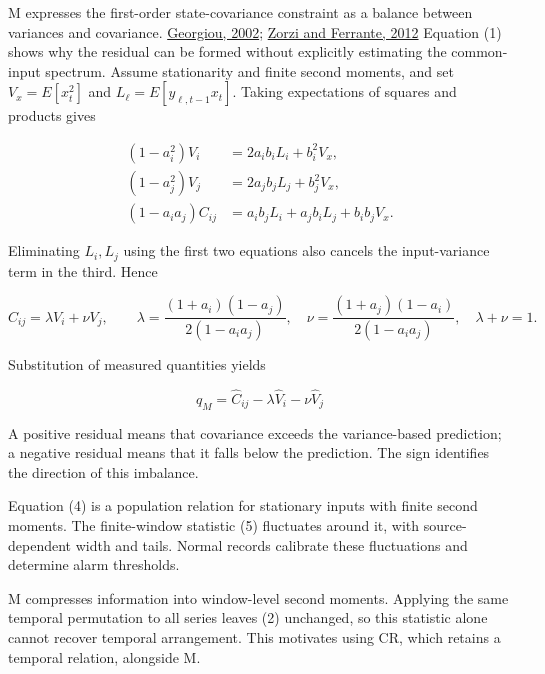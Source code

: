 \documentclass[10pt,a4paper]{article}
\begin{document}
M expresses the first-order state-covariance constraint as a balance between variances and covariance. \href{https://doi.org/10.1109/TAC.2002.800643}{Georgiou, 2002}; \href{https://doi.org/10.1016/j.automatica.2012.05.057}{Zorzi and Ferrante, 2012} Equation (1) shows why the residual can be formed without explicitly estimating the common-input spectrum. Assume stationarity and finite second moments, and set \(V_x=E[x_t^2]\) and \(L_\ell=E[y_{\ell,t-1}x_t]\). Taking expectations of squares and products gives

\begin{equation}
\begin{aligned}
(1-a_i^2)V_i&=2a_i b_i L_i+b_i^2V_x,\\
(1-a_j^2)V_j&=2a_j b_j L_j+b_j^2V_x,\\
(1-a_i a_j)C_{ij}&=a_i b_jL_i+a_j b_iL_j+b_i b_jV_x.
\end{aligned}
\tag{3}
\end{equation}

Eliminating \(L_i,L_j\) using the first two equations also cancels the input-variance term in the third. Hence

\begin{equation}
C_{ij}=\lambda V_i+\nu V_j,\qquad
\lambda=\frac{(1+a_i)(1-a_j)}{2(1-a_i a_j)},\quad
\nu=\frac{(1+a_j)(1-a_i)}{2(1-a_i a_j)},\quad
\lambda+\nu=1.
\tag{4}
\end{equation}

Substitution of measured quantities yields

\begin{equation}
q_M=\widehat C_{ij}-\lambda\widehat V_i-\nu\widehat V_j
\tag{5}
\end{equation}

A positive residual means that covariance exceeds the variance-based prediction; a negative residual means that it falls below the prediction. The sign identifies the direction of this imbalance.

Equation (4) is a population relation for stationary inputs with finite second moments. The finite-window statistic (5) fluctuates around it, with source-dependent width and tails. Normal records calibrate these fluctuations and determine alarm thresholds.

M compresses information into window-level second moments. Applying the same temporal permutation to all series leaves (2) unchanged, so this statistic alone cannot recover temporal arrangement. This motivates using CR, which retains a temporal relation, alongside M.
\end{document}
